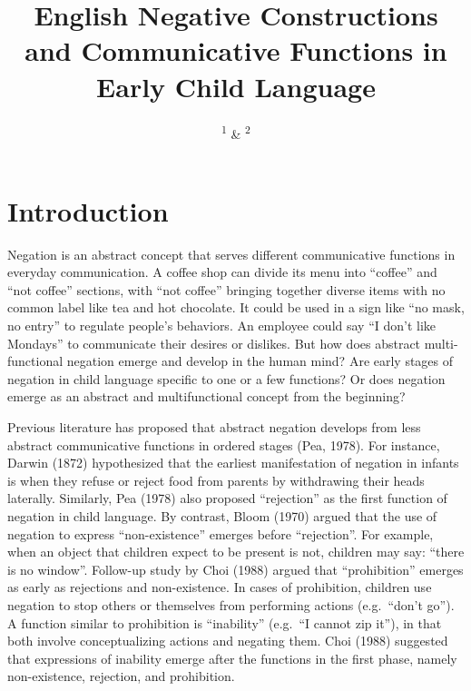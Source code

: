 \documentclass[
  english,
  man,floatsintext]{apa6}
\title{English Negative Constructions and Communicative Functions in Early Child Language}
\author{\textsuperscript{1} \& \textsuperscript{2}}
\date{}
\affiliation{\vspace{0.5cm}\textsuperscript{1} \\\textsuperscript{2} }
\begin{document}
\maketitle

\hypertarget{introduction}{%
\section{Introduction}\label{introduction}}

Negation is an abstract concept that serves different communicative functions in everyday communication. A coffee shop can divide its menu into \enquote{coffee} and \enquote{not coffee} sections, with \enquote{not coffee} bringing together diverse items with no common label like tea and hot chocolate. It could be used in a sign like \enquote{no mask, no entry} to regulate people's behaviors. An employee could say \enquote{I don't like Mondays} to communicate their desires or dislikes. But how does abstract multi-functional negation emerge and develop in the human mind? Are early stages of negation in child language specific to one or a few functions? Or does negation emerge as an abstract and multifunctional concept from the beginning?

Previous literature has proposed that abstract negation develops from less abstract communicative functions in ordered stages (Pea, 1978). For instance, Darwin (1872) hypothesized that the earliest manifestation of negation in infants is when they refuse or reject food from parents by withdrawing their heads laterally. Similarly, Pea (1978) also proposed \enquote{rejection} as the first function of negation in child language. By contrast, Bloom (1970) argued that the use of negation to express \enquote{non-existence} emerges before \enquote{rejection}. For example, when an object that children expect to be present is not, children may say: \enquote{there is no window}. Follow-up study by Choi (1988) argued that \enquote{prohibition} emerges as early as rejections and non-existence. In cases of prohibition, children use negation to stop others or themselves from performing actions (e.g.~\enquote{don't go}). A function similar to prohibition is \enquote{inability} (e.g.~\enquote{I cannot zip it}), in that both involve conceptualizing actions and negating them. Choi (1988) suggested that expressions of inability emerge after the functions in the first phase, namely non-existence, rejection, and prohibition.
\end{document}

